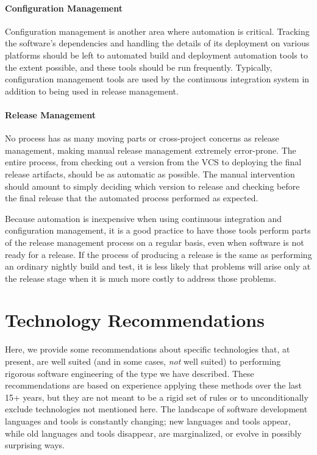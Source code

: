\paragraph{Configuration Management}

Configuration management is another area where automation is
critical. Tracking the software's dependencies and handling the
details of its deployment on various platforms should be left to
automated build and deployment automation tools to the extent
possible, and these tools should be run frequently. Typically,
configuration management tools are used by the continuous integration
system in addition to being used in release management.

\paragraph{Release Management}

No process has as many moving parts or cross-project concerns as
release management, making manual release management extremely
error-prone. The entire process, from checking out a version from the
VCS to deploying the final release artifacts, should be as automatic
as possible. The manual intervention should amount to simply deciding
which version to release and checking before the final release that
the automated process performed as expected.

Because automation is inexpensive when using continuous integration
and configuration management, it is a good practice to have those
tools perform parts of the release management process on a regular
basis, even when software is not ready for a release. If the process
of producing a release is the same as performing an ordinary nightly
build and test, it is less likely that problems will arise only at the
release stage when it is much more costly to address those problems.

\section{Technology Recommendations}
\label{sec:technologies}

Here, we provide some recommendations about specific technologies
that, at present, are well suited (and in some cases, \emph{not} well
suited) to performing rigorous software engineering of the type we
have described. These recommendations are based on experience applying
these methods over the last 15+ years, but they are not meant to be a
rigid set of rules or to unconditionally exclude technologies not
mentioned here. The landscape of software development languages and
tools is constantly changing; new languages and tools appear, while
old languages and tools disappear, are marginalized, or evolve in
possibly surprising ways.

